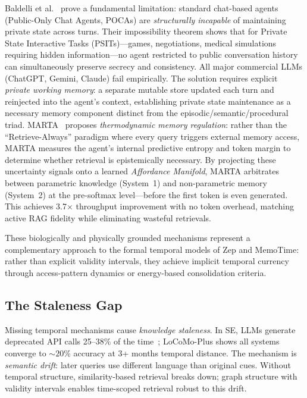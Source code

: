 \documentclass[hf]{ceurart}
\begin{document}
Baldelli et al.~\cite{privatewm2026} prove a fundamental limitation:
standard chat-based agents (Public-Only Chat Agents, POCAs) are
\emph{structurally incapable} of maintaining private state across
turns. Their impossibility theorem shows that for Private State
Interactive Tasks (PSITs)---games, negotiations, medical
simulations requiring hidden information---no agent restricted to
public conversation history can simultaneously preserve secrecy and
consistency. All major commercial LLMs (ChatGPT, Gemini, Claude)
fail empirically. The solution requires explicit \emph{private
working memory}: a separate mutable store updated each turn and
reinjected into the agent's context, establishing private state
maintenance as a necessary memory component distinct from the
episodic/semantic/procedural triad.
MARTA~\cite{marta2026} proposes \emph{thermodynamic memory
regulation}: rather than the ``Retrieve-Always'' paradigm where
every query triggers external memory access, MARTA measures the
agent's internal predictive entropy and token margin to determine
whether retrieval is epistemically necessary. By projecting these
uncertainty signals onto a learned \emph{Affordance Manifold},
MARTA arbitrates between parametric knowledge (System~1) and
non-parametric memory (System~2) at the pre-softmax level---before
the first token is even generated. This achieves 3.7$\times$
throughput improvement with no token overhead, matching active RAG
fidelity while eliminating wasteful retrievals.

These biologically and physically grounded mechanisms represent a
complementary approach to the formal temporal models of Zep and
MemoTime: rather than explicit validity intervals, they achieve
implicit temporal currency through access-pattern dynamics or
energy-based consolidation criteria.

\subsection{The Staleness Gap}

Missing temporal mechanisms cause \emph{knowledge staleness}. In SE,
LLMs generate deprecated API calls 25--38\% of the
time~\cite{wang2025deprecated}; LoCoMo-Plus shows all systems converge
to ${\sim}20$\% accuracy at 3+ months temporal distance. The mechanism
is \emph{semantic drift}: later queries use different language than
original cues. Without temporal structure, similarity-based retrieval
breaks down; graph structure with validity intervals enables
time-scoped retrieval robust to this drift.
\end{document}
